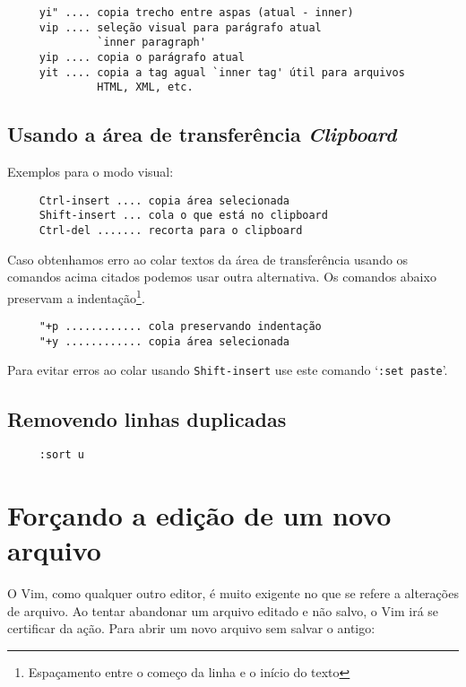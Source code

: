 \begin{verbatim}
     yi" .... copia trecho entre aspas (atual - inner)
     vip .... seleção visual para parágrafo atual 
              `inner paragraph'
     yip .... copia o parágrafo atual
     yit .... copia a tag agual `inner tag' útil para arquivos 
              HTML, XML, etc.
\end{verbatim}

\subsection{Usando a área de transferência {\em Clipboard}}

Exemplos para o modo visual:

\begin{verbatim}
     Ctrl-insert .... copia área selecionada 
     Shift-insert ... cola o que está no clipboard
     Ctrl-del ....... recorta para o clipboard
\end{verbatim}

Caso obtenhamos erro ao colar textos da área de transferência usando os
comandos acima citados podemos usar outra alternativa.  Os comandos abaixo
preservam a indentação\footnote{Espaçamento entre o começo da linha e o início
do texto}.

\begin{verbatim}
     "+p ............ cola preservando indentação
     "+y ............ copia área selecionada
\end{verbatim}

{\Large {}} Para evitar erros ao colar usando {\tt Shift-insert} 
use este comando `{\tt :set paste}'.

\subsection{Removendo linhas duplicadas}
\begin{verbatim}
     :sort u
\end{verbatim}

\section{Forçando a edição de um novo arquivo}\label{sec:Forçando a edição de um novo arquivo}

O Vim, como qualquer outro editor, é muito exigente no que se refere a alterações
de arquivo.  Ao tentar abandonar um arquivo editado e não salvo, o Vim irá se certificar
da ação. Para abrir um novo arquivo sem salvar o antigo:

